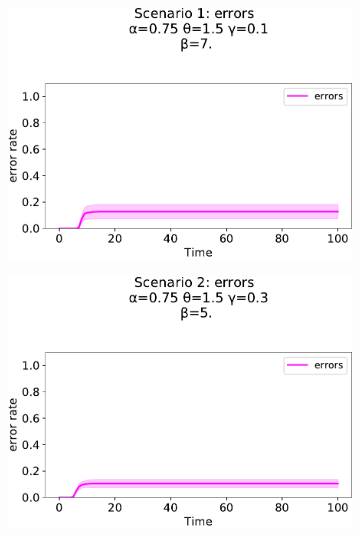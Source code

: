 \begin{figure}[!ht]
\begin{subfigure}[b]{0.32\textwidth}
    \includegraphics[width=\textwidth]{papers/swarm-intelligence2021/img/simulations/standard-errors_0_08_α-0.75_θ-1.5_γ-0.1_β-7._ω-0._ζ-0..pdf}
  \end{subfigure}
  \hfill
  \begin{subfigure}[b]{0.32\textwidth}
    \centering
    \includegraphics[width=\textwidth]{papers/swarm-intelligence2021/img/simulations/stretched-errors_0_08_α-0.75_θ-1.5_γ-0.3_β-5._ω-0._ζ-0..pdf}
  \end{subfigure}
  \\
  \begin{subfigure}[b]{0.32\textwidth}
    \centering

\end{subfigure}
\end{figure}
